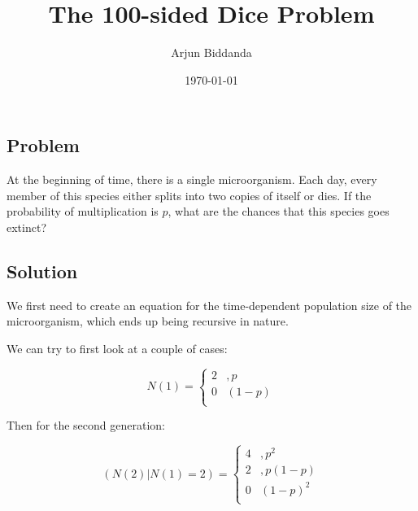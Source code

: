 \documentclass[12pt]{article}
\title{The 100-sided Dice Problem}
\author{Arjun Biddanda}
\date{\today}
\begin{document}
\maketitle
\linenumbers

\subsection*{Problem}

At the beginning of time, there is a single microorganism. Each day, every member of this species either splits into two copies of itself or dies. If the probability of multiplication is $p$, what are the chances that this species goes extinct?


\subsection*{Solution}

We first need to create an equation for the time-dependent population size of the microorganism, which ends up being recursive in nature.

We can try to first look at a couple of cases:

$$
N(1) =
  \begin{cases}
      2 &, p \\
      0 & (1-p)\\
   \end{cases}
$$

Then for the second generation:

$$
(N(2) | N(1) = 2) =
  \begin{cases}
      4 &, p^2 \\
      2 &, p(1-p)\\
      0 & (1-p)^2\\
   \end{cases}
$$

\end{document}
